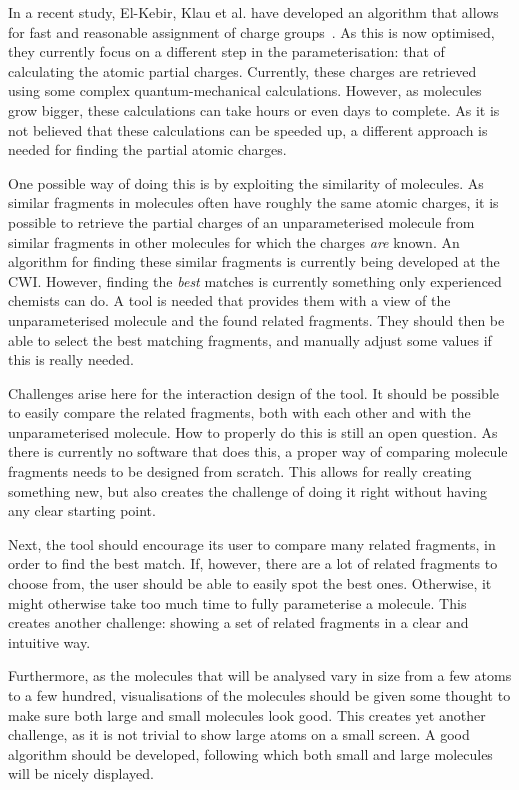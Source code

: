 In a recent study, El-Kebir, Klau et al. have developed an algorithm that allows for fast and reasonable assignment of charge groups~\cite{canzar2012charge}. As this is now optimised, they currently focus on a different step in the parameterisation: that of calculating the atomic partial charges. Currently, these charges are retrieved using some complex quantum-mechanical calculations. However, as molecules grow bigger, these calculations can take hours or even days to complete. As it is not believed that these calculations can be speeded up, a different approach is needed for finding the partial atomic charges.

One possible way of doing this is by exploiting the similarity of molecules. As similar fragments in molecules often have roughly the same atomic charges, it is possible to retrieve the partial charges of an unparameterised molecule from similar fragments in other molecules for which the charges \emph{are} known. An algorithm for finding these similar fragments is currently being developed at the CWI. However, finding the \emph{best} matches is currently something only experienced chemists can do. A tool is needed that provides them with a view of the unparameterised molecule and the found related fragments. They should then be able to select the best matching fragments, and manually adjust some values if this is really needed.

Challenges arise here for the interaction design of the tool. It should be possible to easily compare the related fragments, both with each other and with the unparameterised molecule. How to properly do this is still an open question. As there is currently no software that does this, a proper way of comparing molecule fragments needs to be designed from scratch. This allows for really creating something new, but also creates the challenge of doing it right without having any clear starting point.

Next, the tool should encourage its user to compare many related fragments, in order to find the best match. If, however, there are a lot of related fragments to choose from, the user should be able to easily spot the best ones. Otherwise, it might otherwise take too much time to fully parameterise a molecule. This creates another challenge: showing a set of related fragments in a clear and intuitive way.

Furthermore, as the molecules that will be analysed vary in size from a few atoms to a few hundred, visualisations of the molecules should be given some thought to make sure both large and small molecules look good. This creates yet another challenge, as it is not trivial to show large atoms on a small screen. A good algorithm should be developed, following which both small and large molecules will be nicely displayed.

